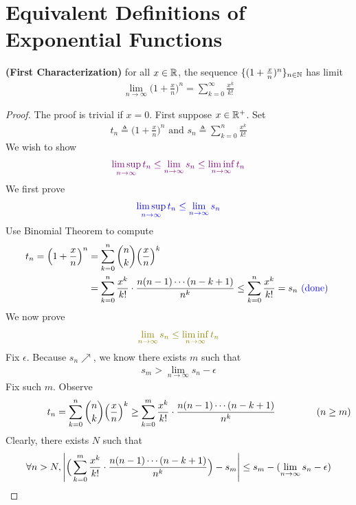 \documentclass{report}
\begin{document}
\section{Equivalent Definitions of Exponential Functions}
\begin{theorem}
\textbf{(First Characterization)} for all $x\in\mathbb{R}$, the sequence $\{ (1+\frac{x}{n})^n \}_{n\in\mathbb{N}}$ has limit 
\begin{align*}
\lim_{n\to \infty} \Big(1+\frac{x}{n}\Big)^n = \sum_{k=0}^\infty \frac{x^k}{k!}
\end{align*}
\end{theorem}
\begin{proof}
The proof is trivial if $x=0$. First suppose  $x\in\mathbb{R}^+$. Set 
\begin{align*}
t_n\triangleq \Big(1+\frac{x}{n}\Big)^n\text{ and }s_n\triangleq \sum_{k=0}^n \frac{x^k}{k!}
\end{align*}
We wish to show 
\begin{align*}
\textcolor{violet}{\limsup_{n\to\infty} t_n\leq \lim_{n\to \infty}s_n\leq \liminf_{n\to\infty} t_n}
\end{align*}
We first prove 
\begin{align*}
\textcolor{blue}{\limsup_{n\to\infty} t_n\leq \lim_{n\to \infty}s_n}
\end{align*}
Use Binomial Theorem to compute 
\begin{align*}
t_n=\Big(1+\frac{x}{n} \Big)^n&= \sum_{k=0}^n \binom{n}{k} \Big(\frac{x}{n} \Big)^k\\
&=\sum_{k=0}^n \frac{x^k}{k!} \cdot \frac{n(n-1)\cdots (n-k+1)}{n^k} \leq \sum_{k=0}^n \frac{x^k}{k!}=s_n \textcolor{blue}{\text{ (done) }}
\end{align*}
We now prove 
\begin{align*}
\olive{\lim_{n\to \infty}s_n\leq \liminf_{n\to\infty} t_n}
\end{align*}
Fix $\epsilon $. Because $s_n\nearrow $, we know there exists  $m$ such that 
 \begin{align*}
s_m> \lim_{n\to \infty}s_n -\epsilon 
\end{align*}
Fix such $m$. Observe 
 \begin{align*}
\hspace{1.5cm}t_n=\sum _{k=0}^n \binom{n}{k}\Big(\frac{x}{n} \Big)^k\geq \sum_{k=0}^m \frac{x^k}{k!}\cdot \frac{n(n-1)\cdots (n-k+1)}{n^k}\hspace{1.5cm}(n\geq m)
\end{align*}
Clearly, there exists $N$ such that 
\begin{align*}
  \forall n>N, \abso{\Big( \sum_{k=0}^m \frac{x^k}{k!}\cdot \frac{n(n-1)\cdots (n-k+1)}{n^k}\Big) - s_m }\leq  s_m-(\lim_{n\to \infty}s_n-\epsilon )

\end{align*}
\end{proof}
\end{document}
